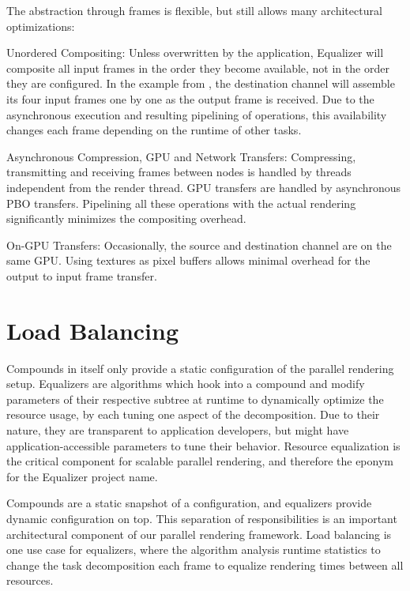 The abstraction through frames is flexible, but still allows many architectural
optimizations:
\begin{compactdesc}
\item[Unordered Compositing:] Unless overwritten by the application, Equalizer
will composite all input frames in the order they become available, not in the
order they are configured. In the example from , the
destination channel will assemble its four input frames one by one as the output
frame is received. Due to the asynchronous execution and resulting pipelining of
operations, this availability changes each frame depending on the runtime of
other tasks.
\item[Asynchronous Compression, GPU and Network Transfers:] Compressing,
transmitting and receiving frames between nodes is handled by threads
independent from the render thread. GPU transfers are handled by asynchronous
PBO transfers. Pipelining all these operations with the actual rendering
significantly minimizes the compositing overhead.
\item[On-GPU Transfers:] Occasionally, the source and destination channel are on
the same GPU. Using textures as pixel buffers allows minimal overhead for the
output to input frame transfer.
\end{compactdesc}

\section{Load Balancing}

Compounds in itself only provide a static configuration of the parallel
rendering setup. \textsf{Equalizers} are algorithms which hook into a compound
and modify parameters of their respective subtree at runtime to dynamically
optimize the resource usage, by each tuning one aspect of the decomposition. Due
to their nature, they are transparent to application developers, but might have
application-accessible parameters to tune their behavior. Resource equalization
is the critical component for scalable parallel rendering, and therefore the
eponym for the \textsf{Equalizer} project name.

Compounds are a static snapshot of a configuration, and equalizers provide
dynamic configuration on top. This separation of responsibilities is an
important architectural component of our parallel rendering framework. Load
balancing is one use case for equalizers, where the algorithm analysis runtime
statistics to change the task decomposition each frame to equalize rendering
times between all resources.

